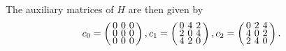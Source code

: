 \documentclass[../../main]{subfiles}
\begin{document}
The auxiliary matrices of $H$ are then given by
\[
  \arraycolsep=1.75pt\def\arraystretch{0.5}
  c_0 =
  \left(
    \begin{array}{ccc}
      0&0&0\\
      0&0&0\\
      0&0&0
    \end{array}
  \right),
  c_1 =
  \left(
   \begin{array}{ccc}
     0&4&2\\
     2&0&4\\
     4&2&0
   \end{array}
 \right),
 c_2 =
 \left(
   \begin{array}{ccc}
     0&2&4\\
     4&0&2\\
     2&4&0
   \end{array}
 \right).
\]
\end{document}
